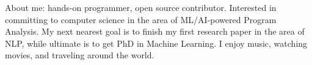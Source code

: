 \documentclass[10pt,a4paper,normalphoto]{altacv}
\begin{document}
  \makecvheader
  About me: hands-on programmer, open source contributor.
  Interested in committing to computer science in the area of ML/AI-powered
  Program Analysis. My next nearest goal is to finish my first research paper
  in the area of NLP, while ultimate is to get PhD in Machine Learning.
  I enjoy music, watching movies, and traveling around the world.
\end{document}
